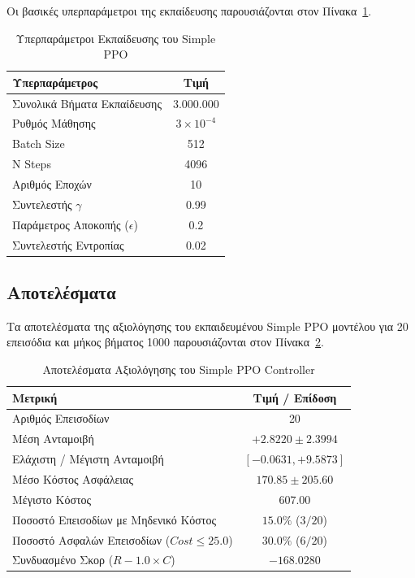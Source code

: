\documentclass[acmsmall,screen,nonacm]{acmart}
\begin{document}
	Οι βασικές υπερπαράμετροι της εκπαίδευσης παρουσιάζονται στον Πίνακα~\ref{tab:ppo_unconstrained_hyperparams}.

	\begin{table}[H]
		\centering
		\begin{tabular}{lc}
			\toprule
			\textbf{Υπερπαράμετρος} & \textbf{Τιμή} \\
			\midrule
			Συνολικά Βήματα Εκπαίδευσης & 3.000.000 \\
			Ρυθμός Μάθησης & $3 \times 10^{-4}$ \\
			Batch Size & 512 \\
			N Steps & 4096 \\
			Αριθμός Εποχών & 10 \\
			Συντελεστής $\gamma$ & 0.99 \\
			Παράμετρος Αποκοπής ($\epsilon$) & 0.2 \\
			Συντελεστής Εντροπίας & 0.02 \\
			\bottomrule
		\end{tabular}
		\caption{Υπερπαράμετροι Εκπαίδευσης του Simple PPO}
		\label{tab:ppo_unconstrained_hyperparams}
	\end{table}

	\subsection{Αποτελέσματα}
	Τα αποτελέσματα της αξιολόγησης του εκπαιδευμένου Simple PPO μοντέλου για 20 επεισόδια και μήκος βήματος 1000 παρουσιάζονται στον Πίνακα~\ref{tab:ppo_unconstrained_results}.

	\begin{table}[H]
		\centering
		\begin{tabular}{lc}
			\toprule
			\textbf{Μετρική} & \textbf{Τιμή / Επίδοση} \\
			\midrule
			Αριθμός Επεισοδίων & 20 \\
			Μέση Ανταμοιβή & $+2.8220 \pm 2.3994$ \\
			Ελάχιστη / Μέγιστη Ανταμοιβή & $[-0.0631, +9.5873]$ \\
			Μέσο Κόστος Ασφάλειας  & $170.85 \pm 205.60$ \\
			Μέγιστο Κόστος  & $607.00$ \\
			Ποσοστό Επεισοδίων με Μηδενικό Κόστος & $15.0\%$ ($3/20$) \\
			Ποσοστό Ασφαλών Επεισοδίων ($Cost \le 25.0$) & $30.0\%$ ($6/20$) \\
			Συνδυασμένο Σκορ ($R - 1.0 \times C$) & $-168.0280$ \\
			\bottomrule
		\end{tabular}
		\caption{Αποτελέσματα Αξιολόγησης του Simple PPO Controller}
		\label{tab:ppo_unconstrained_results}
	\end{table}
\end{document}

